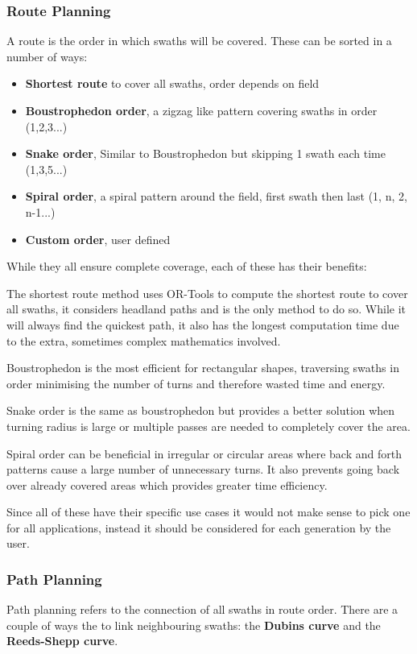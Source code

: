 \documentclass[final]{cmpreport_02}
\begin{document}
\subsubsection{Route Planning}
A route is the order in which swaths will be covered.
These can be sorted in a number of ways:

\begin{itemize}
	\item{\textbf{Shortest route} to cover all swaths, order depends on field}
	\item{\textbf{Boustrophedon order}, a zigzag like pattern covering swaths in order (1,2,3...)}
	\item{\textbf{Snake order}, Similar to Boustrophedon but skipping 1 swath each time (1,3,5...)}
	\item{\textbf{Spiral order}, a spiral pattern around the field, first swath then last (1, n, 2, n-1...)}
	\item{\textbf{Custom order}, user defined}
\end{itemize}
While they all ensure complete coverage, each of these has their benefits:

The shortest route method uses OR-Tools \citep{ortools} to compute the shortest route to cover all swaths, it considers headland paths and is the only method to do so.
While it will always find the quickest path, it also has the longest computation time due to the extra, sometimes complex mathematics involved.

Boustrophedon is the most efficient for rectangular shapes, traversing swaths in order minimising the number of turns and therefore wasted time and energy.

Snake order is the same as boustrophedon but provides a better solution when turning radius is large or multiple passes are needed to completely cover the area.


Spiral order can be beneficial in irregular or circular areas where back and forth patterns cause a large number of unnecessary turns.
It also prevents going back over already covered areas which provides greater time efficiency.

Since all of these have their specific use cases it would not make sense to pick one for all applications, instead it should be considered for each generation by the user.

\subsubsection{Path Planning}
Path planning refers to the connection of all swaths in route order.
There are a couple of ways the to link neighbouring swaths: the \textbf{Dubins curve} and the \textbf{Reeds-Shepp curve}.
\end{document}
